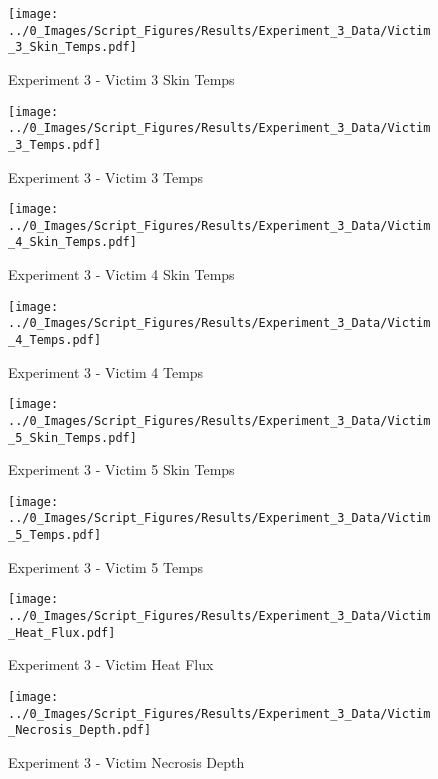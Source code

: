 	\clearpage

	\begin{figure}[H]
		\centering
		\texttt{[image: ../0\_Images/Script\_Figures/Results/Experiment\_3\_Data/Victim\_3\_Skin\_Temps.pdf]}
		\caption[]{Experiment 3 - Victim 3 Skin Temps}
	\end{figure}
 

	\begin{figure}[H]
		\centering
		\texttt{[image: ../0\_Images/Script\_Figures/Results/Experiment\_3\_Data/Victim\_3\_Temps.pdf]}
		\caption[]{Experiment 3 - Victim 3 Temps}
	\end{figure}
 
	\clearpage

	\begin{figure}[H]
		\centering
		\texttt{[image: ../0\_Images/Script\_Figures/Results/Experiment\_3\_Data/Victim\_4\_Skin\_Temps.pdf]}
		\caption[]{Experiment 3 - Victim 4 Skin Temps}
	\end{figure}
 

	\begin{figure}[H]
		\centering
		\texttt{[image: ../0\_Images/Script\_Figures/Results/Experiment\_3\_Data/Victim\_4\_Temps.pdf]}
		\caption[]{Experiment 3 - Victim 4 Temps}
	\end{figure}
 
	\clearpage

	\begin{figure}[H]
		\centering
		\texttt{[image: ../0\_Images/Script\_Figures/Results/Experiment\_3\_Data/Victim\_5\_Skin\_Temps.pdf]}
		\caption[]{Experiment 3 - Victim 5 Skin Temps}
	\end{figure}
 

	\begin{figure}[H]
		\centering
		\texttt{[image: ../0\_Images/Script\_Figures/Results/Experiment\_3\_Data/Victim\_5\_Temps.pdf]}
		\caption[]{Experiment 3 - Victim 5 Temps}
	\end{figure}
 
	\clearpage

	\begin{figure}[H]
		\centering
		\texttt{[image: ../0\_Images/Script\_Figures/Results/Experiment\_3\_Data/Victim\_Heat\_Flux.pdf]}
		\caption[]{Experiment 3 - Victim Heat Flux}
	\end{figure}
 

	\begin{figure}[H]
		\centering
		\texttt{[image: ../0\_Images/Script\_Figures/Results/Experiment\_3\_Data/Victim\_Necrosis\_Depth.pdf]}
		\caption[]{Experiment 3 - Victim Necrosis Depth}
	\end{figure}
 
